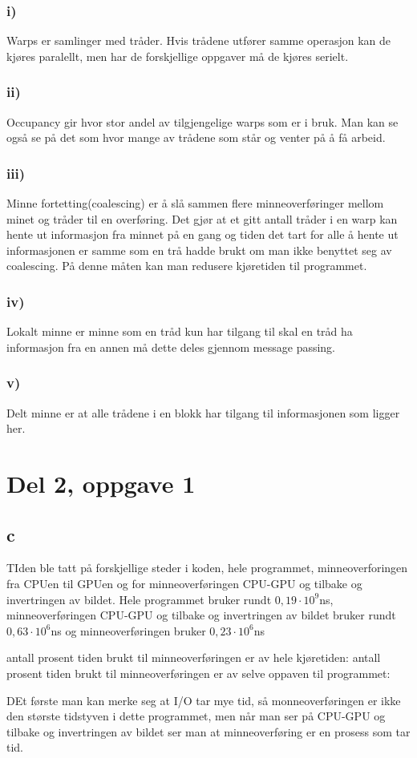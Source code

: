 \documentclass[12pt, a4paper]{article} %
\begin{document}
\subsubsection*{i)}
Warps er samlinger med tråder. Hvis trådene utfører samme operasjon kan de kjøres paralellt, men har de forskjellige oppgaver må de kjøres serielt.
\subsubsection*{ii)}
Occupancy gir hvor stor andel av tilgjengelige warps som er i bruk. Man kan se også se på det som hvor mange av trådene som står og venter på å få arbeid. 
\subsubsection*{iii)}
Minne fortetting(coalescing) er å slå sammen flere minneoverføringer mellom minet og tråder til en overføring. Det gjør at et gitt antall tråder i en warp kan hente ut informasjon fra minnet på en gang og tiden det tart for alle å hente ut informasjonen er samme som en trå hadde brukt om man ikke benyttet seg av coalescing. På denne måten kan man redusere kjøretiden til programmet.
\subsubsection*{iv)}
Lokalt minne er minne som en tråd kun har tilgang til skal en tråd ha informasjon fra en annen må dette deles gjennom message passing.
\subsubsection*{v)}
Delt minne er at alle trådene i en blokk har tilgang til informasjonen som ligger her.

\section*{Del 2, oppgave 1}
\subsection*{c}
TIden ble tatt på forskjellige steder i koden, hele programmet, minneoverforingen fra CPUen til GPUen og for minneoverføringen CPU-GPU og tilbake og invertringen av bildet. Hele programmet bruker rundt $0,19\cdot 10^9$ns, minneoverføringen CPU-GPU og tilbake og invertringen av bildet bruker rundt $0,63\cdot 10^6$ns og minneoverføringen bruker $0,23 \cdot 10^6$ns

antall prosent tiden brukt til minneoverføringen er av hele kjøretiden: 
antall prosent tiden brukt til minneoverføringen er av selve oppaven til programmet:

DEt første man kan merke seg at I/O tar mye tid, så monneoverføringen er ikke den største tidstyven i dette programmet, men når man ser på CPU-GPU og tilbake og invertringen av bildet ser man at minneoverføring er en prosess som tar tid.
\end{document}
